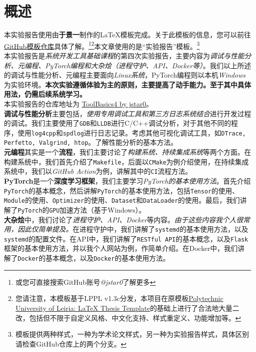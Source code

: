 \thispagestyle{plain} %
\chapter*{概述} %
\label{cp:abstract}

本实验报告使用由\textbf{于景一}制作的\LaTeX{}模板完成。关于此模板的信息，您可以前往\href{https://github.com/jstar0/LaTeXTemplate/}{GitHub模板仓库}具体了解。\footnote{或您可直接搜索GitHub账号\textit{@jstar0}了解更多}\footnote{您请注意，本模板基于LPPL v1.3c分发，本项目在原模板\href{https://github.com/joseareia/ipleiria-thesis}{Polytechnic University of Leiria: LaTeX Thesis Template}的基础上进行了合法地大量二改，包括但不限于自定义风格、中文化支持、样式重定义、功能增加等。}本文章使用的是“实验报告”模板。\footnote{模板提供两种样式，一种为学术论文样式，另一种为实验报告样式，具体区别请检查GitHub仓库上的两个分支。}\\

本实验报告是\textit{系统开发工具基础课程}的第四次实验报告，主要内容为\textit{调试与性能分析、元编程、PyTorch编程和大杂烩（进程守护、API、Docker等）}。我们以上所述的调试与性能分析、元编程主要面向\textit{Linux系统}，PyTorch编程则以本机\textit{Windows}为实验环境。\textbf{本次实验遵循体验为主的原则，主要提高了动手能力。至于其中具体用法，仍需后续系统学习。}\\

本实验报告的仓库地址为 \href{https://github.com/jstar0/ToolBasics4}{ToolBasics4 by jstar0}。\\

\textbf{调试与性能分析}主要包括，\textit{使用专用调试工具和第三方日志系统结合}进行开发过程的调试。我们主要使用了\texttt{GDB}和\texttt{LLDB}进行C/C++调试分析，对于其他不同的程序，使用\texttt{log4cpp}和\texttt{spdlog}进行日志记录。考虑其他可视化调试工具，如\texttt{DTrace, Perfetto, Valgrind, htop}。了解性能分析的基本方法。\\

\textbf{元编程}其实是一个\textbf{流程}，我们主要讨论了\textit{构建系统、持续集成系统}等两个方面。在构建系统中，我们首先介绍了\texttt{Makefile}，后面以\texttt{CMake}为例介绍使用，在持续集成系统中，我们以\textit{GitHub Action}为例，讲解其中的\texttt{CI}流程方法。\\

\textbf{PyTorch}是一个\textbf{深度学习框架}，我们主要学习\textit{PyTorch的基本使用方法}。首先介绍\texttt{PyTorch}的基本概念，然后讲解\texttt{PyTorch}的基本使用方法，包括\texttt{Tensor}的使用、\texttt{Module}的使用、\texttt{Optimizer}的使用、\texttt{Dataset}和\texttt{DataLoader}的使用。最后，我们讲解了\texttt{PyTorch}的\texttt{GPU}加速方法（基于Windows）。\\

\textbf{大杂烩}中，我们讨论了\textit{进程守护、API、Docker}等内容。\textit{由于这些内容我个人很常用，因此仅简单提及。}在进程守护中，我们讲解了\texttt{systemd}的基本使用方法，以及\texttt{systemd}的配置文件。在API中，我们讲解了\texttt{RESTful API}的基本概念，以及\texttt{Flask}框架的基本使用方法，并以我个人网站为例，作简单介绍。在Docker中，我们讲解了\texttt{Docker}的基本概念，以及\texttt{Docker}的基本使用方法。